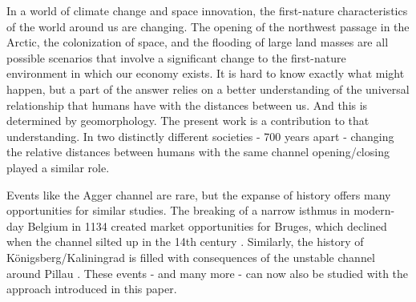 \documentclass[11pt]{article}
\begin{document}
In a world of climate change and space innovation, the first-nature characteristics of the world around us are changing. The opening of the northwest passage in the Arctic, the colonization of space, and the flooding of large land masses are all possible scenarios that involve a significant change to the first-nature environment in which our economy exists. It is hard to know exactly what might happen, but a part of the answer relies on a better understanding of the universal relationship that humans have with the distances between us. And this is determined by geomorphology. The present work is a contribution to that understanding. In two distinctly different societies - 700 years apart - changing the relative distances between humans with the same channel opening/closing played a similar role. 

Events like the Agger channel are rare, but the expanse of history offers many opportunities for similar studies. The breaking of a narrow isthmus in modern-day Belgium in 1134 created market opportunities for Bruges, which declined when the channel silted up in the 14th century \citep{Houtte1966, Charlier2011}. Similarly, the history of Königsberg/Kaliningrad is filled with consequences of the unstable channel around Pillau \citep{Britannica2018}. These events - and many more - can now also be studied with the approach introduced in this paper. 

\newpage



\newpage

\end{document}
